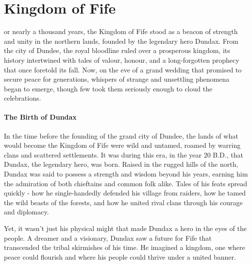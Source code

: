\chapter{Kingdom of Fife}
{\entryfont {}or nearly a thousand years, the Kingdom of Fife stood as a beacon of strength and unity in the northern lands, founded by the legendary hero Dundax. From the city of Dundee, the royal bloodline ruled over a prosperous kingdom, its history intertwined with tales of valour, honour, and a long-forgotten prophecy that once foretold its fall. Now, on the eve of a grand wedding that promised to secure peace for generations, whispers of strange and unsettling phenomena began to emerge, though few took them seriously enough to cloud the celebrations.

}

\subsubsection*{The Birth of Dundax}
{\entryfont In the time before the founding of the grand city of Dundee, the lands of what would become the Kingdom of Fife were wild and untamed, roamed by warring clans and scattered settlements. It was during this era, in the year 20 B.D., that Dundax, the legendary hero, was born. Raised in the rugged hills of the north, Dundax was said to possess a strength and wisdom beyond his years, earning him the admiration of both chieftains and common folk alike. Tales of his feats spread quickly - how he single-handedly defended his village from raiders, how he tamed the wild beasts of the forests, and how he united rival clans through his courage and diplomacy.

Yet, it wasn't just his physical might that made Dundax a hero in the eyes of the people. A dreamer and a visionary, Dundax saw a future for Fife that transcended the tribal skirmishes of his time. He imagined a kingdom, one where peace could flourish and where his people could thrive under a united banner.}

